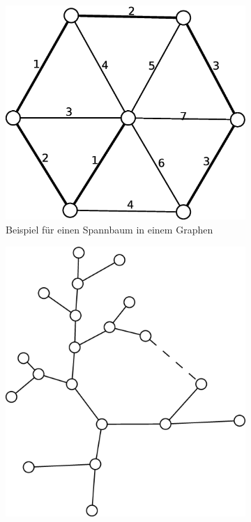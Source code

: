 \begin{figure}
\centering
\begin{subfigure}[h]{0.3\textwidth}
	\includegraphics[width=\linewidth]{19/Grafik/Spannbaum}
	\caption{Beispiel für einen Spannbaum in einem Graphen}
	\label{fig:Spannbaum}
\end{subfigure}
\begin{subfigure}[h]{0.3\textwidth}
	\includegraphics[width=\linewidth]{19/Grafik/SpannbaumBeispiel2}

\end{subfigure}
\end{figure}
